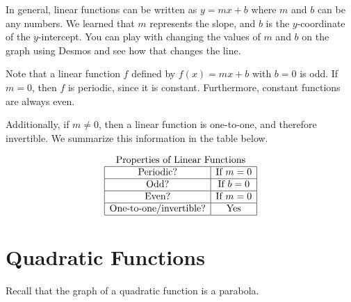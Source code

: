 \documentclass[nooutcomes]{ximera}
\begin{document}
In general, linear functions can be written as $y=mx+b$ where $m$ and $b$ can be any numbers. We learned that $m$ represents the slope, and $b$ is the $y$-coordinate of the $y$-intercept. You can play with changing the values of $m$ and $b$ on the graph using Desmos and see how that changes the line.  

\begin{center}  
\end{center}

Note that a linear function $f$ defined by $f(x) = mx + b$ with $b = 0$ is odd. If $m = 0$, then $f$ is periodic, since it is constant. Furthermore, constant functions are always even.

Additionally, if $m \ne 0$, then a linear function is one-to-one, and therefore invertible. We summarize this information in the table below.

\[
\begin{array}{  c  }
\text{\normalfont Properties of Linear Functions} \\
 \begin{array}{|c|c|}
 \hline
\text{Periodic?} & \text{If } m = 0 \\ \hline
\text{Odd?} & \text{If } b = 0 \\ \hline
\text{Even?} & \text{If } m = 0 \\ \hline
\text{One-to-one/invertible?} & \text{Yes}\\ \hline
\end{array}
\end{array}
\]

\newpage


\section{Quadratic Functions}

Recall that the graph of a quadratic function is a parabola.
\end{document}
